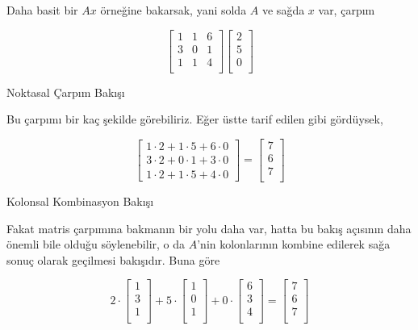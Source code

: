 \documentclass[12pt,fleqn]{article}\usepackage{../../common}
\begin{document}
Daha basit bir $Ax$ örneğine bakarsak, yani solda $A$ ve sağda $x$
var, çarpım

$$
\left[\begin{array}{ccc}
1 & 1 & 6 \\
3 & 0 & 1 \\
1 & 1 & 4 \\
\end{array}\right]
\left[\begin{array}{ccc}
2  \\
5  \\
0  \\
\end{array}\right]
$$

Noktasal Çarpım Bakışı

Bu çarpımı bir kaç şekilde görebiliriz. Eğer üstte tarif edilen gibi gördüysek,

$$
\left[\begin{array}{ccc}
1\cdot 2 + 1\cdot 5 + 6\cdot 0 \\
3\cdot 2 + 0\cdot 1 + 3\cdot 0 \\
1\cdot 2 + 1\cdot 5 + 4\cdot 0 
\end{array}\right]
=
\left[\begin{array}{c}
7 \\
6 \\
7 \\
\end{array}\right]
$$

Kolonsal Kombinasyon Bakışı

Fakat matris çarpımına bakmanın bir yolu daha var, hatta bu bakış açısının daha
önemli bile olduğu söylenebilir, o da $A$'nin kolonlarının kombine edilerek
sağa sonuç olarak geçilmesi bakışıdır. Buna göre

$$ 
2\cdot 
\left[\begin{array}{ccc}
1 \\
3 \\
1 \\
\end{array}\right]
+
5\cdot 
\left[\begin{array}{c}
1 \\
0 \\
1 \\
\end{array}\right]
+
0\cdot 
\left[\begin{array}{c}
6 \\
3 \\
4 \\
\end{array}\right]
=
\left[\begin{array}{c}
7 \\
6 \\
7 \\
\end{array}\right]
$$
\end{document}
